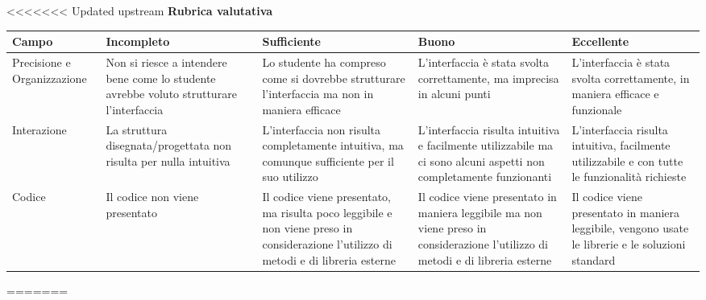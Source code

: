 <<<<<<< Updated upstream
\textbf{Rubrica valutativa}  
\begin{center}
  
\begin{tabular}{|p{3cm}|p{3cm}|p{3cm}|p{3cm}|p{3cm}||}
  \hline
  Campo &Incompleto & Sufficiente & Buono & Eccellente \\
  \hline
  Precisione e Organizzazione & Non si riesce a intendere bene come lo studente avrebbe voluto strutturare l'interfaccia & Lo studente ha compreso come si dovrebbe strutturare l'interfaccia ma non in maniera efficace & L'interfaccia è stata svolta correttamente, ma imprecisa in alcuni punti & L'interfaccia è stata svolta correttamente, in maniera efficace e funzionale \\
  \hline
  Interazione & La struttura disegnata/progettata non risulta per nulla intuitiva & L'interfaccia non risulta completamente intuitiva, ma comunque sufficiente per il suo utilizzo & L'interfaccia risulta intuitiva e facilmente utilizzabile ma ci sono alcuni aspetti non completamente funzionanti & L'interfaccia risulta intuitiva, facilmente utilizzabile e con tutte le funzionalità richieste \\
  \hline
  Codice & Il codice non viene presentato & Il codice viene presentato, ma risulta poco leggibile e non viene preso in considerazione l'utilizzo di metodi e di libreria esterne & Il codice viene presentato in maniera leggibile ma non viene preso in considerazione l'utilizzo di metodi e di libreria esterne & Il codice viene presentato in maniera leggibile, vengono usate le librerie e le soluzioni standard \\
  \hline
\end{tabular}

\end{center}
=======
